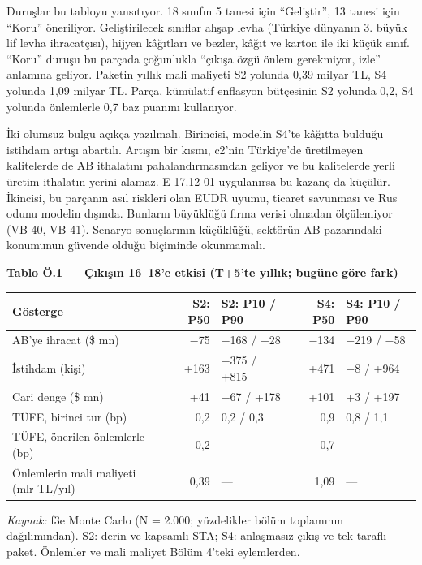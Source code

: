 Duruşlar bu tabloyu yansıtıyor. 18 sınıfın 5 tanesi için ``Geliştir'', 13 tanesi için ``Koru'' öneriliyor. Geliştirilecek sınıflar ahşap levha (Türkiye dünyanın 3. büyük lif levha ihracatçısı), hijyen kâğıtları ve bezler, kâğıt ve karton ile iki küçük sınıf. ``Koru'' duruşu bu parçada çoğunlukla ``çıkışa özgü önlem gerekmiyor, izle'' anlamına geliyor. Paketin yıllık mali maliyeti S2 yolunda 0,39 milyar TL, S4 yolunda 1,09 milyar TL. Parça, kümülatif enflasyon bütçesinin S2 yolunda 0,2, S4 yolunda önlemlerle 0,7 baz puanını kullanıyor.

İki olumsuz bulgu açıkça yazılmalı. Birincisi, modelin S4'te kâğıtta bulduğu istihdam artışı abartılı. Artışın bir kısmı, c2'nin Türkiye'de üretilmeyen kalitelerde de AB ithalatını pahalandırmasından geliyor ve bu kalitelerde yerli üretim ithalatın yerini alamaz. E-17.12-01 uygulanırsa bu kazanç da küçülür. İkincisi, bu parçanın asıl riskleri olan EUDR uyumu, ticaret savunması ve Rus odunu modelin dışında. Bunların büyüklüğü firma verisi olmadan ölçülemiyor (VB-40, VB-41). Senaryo sonuçlarının küçüklüğü, sektörün AB pazarındaki konumunun güvende olduğu biçiminde okunmamalı.


\textbf{Tablo Ö.1 --- Çıkışın 16--18'e etkisi (T+5'te yıllık; bugüne göre fark)}

\nopagebreak[4]

\begingroup\gbtablo\footnotesize

\begin{longtable}[]{@{}lrlrl@{}}
\toprule\noalign{}
\textbf{Gösterge} & \textbf{S2: P50} & \textbf{S2: P10 / P90} & \textbf{S4: P50} & \textbf{S4: P10 / P90} \\
\midrule\noalign{}
\endhead
\bottomrule\noalign{}
\endlastfoot
AB'ye ihracat (\$ mn) & −75 & −168 / +28 & −134 & −219 / −58 \\
İstihdam (kişi) & +163 & −375 / +815 & +471 & −8 / +964 \\
Cari denge (\$ mn) & +41 & −67 / +178 & +101 & +3 / +197 \\
TÜFE, birinci tur (bp) & 0,2 & 0,2 / 0,3 & 0,9 & 0,8 / 1,1 \\
TÜFE, önerilen önlemlerle (bp) & 0,2 & --- & 0,7 & --- \\
Önlemlerin mali maliyeti (mlr TL/yıl) & 0,39 & --- & 1,09 & --- \\
\end{longtable}

\endgroup

\emph{Kaynak:} \etiketT{} f3e Monte Carlo (N = 2.000; yüzdelikler bölüm toplamının dağılımından). S2: derin ve kapsamlı STA; S4: anlaşmasız çıkış ve tek taraflı paket. Önlemler ve mali maliyet Bölüm 4'teki eylemlerden.


